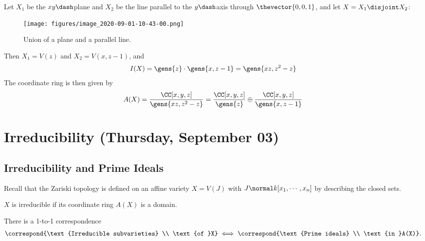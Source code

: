 \begin{example}

Let \(X_1\) be the \(xy\dash\)plane and \(X_2\) be the line parallel to
the \(y\dash\)axis through \(\thevector{0,0,1}\), and let
\(X= X_1 \disjoint X_2\):

\begin{figure}
\centering
\texttt{[image: figures/image\_2020-09-01-10-43-00.png]}
\caption{Union of a plane and a parallel line.}
\end{figure}

Then \(X_1 = V(z)\) and \(X_2 = V(x, z-1)\), and
\begin{align*}
I(X) = \gens{z} \cdot \gens{x, z-1}=  \gens{xz, z^2 - z}
\end{align*} The coordinate ring is then given by
\begin{align*}
A(X) = { \CC[x, y, z] \over \gens{xz, z^2 - z} } = { \CC[x, y, z] \over  \gens{z} } \oplus { \CC[x, y,z] \over \gens{x, z-1} }
\end{align*}

\end{example}

\hypertarget{irreducibility-thursday-september-03}{%
\section{Irreducibility (Thursday, September
03)}\label{irreducibility-thursday-september-03}}

\hypertarget{irreducibility-and-prime-ideals}{%
\subsection{Irreducibility and Prime
Ideals}\label{irreducibility-and-prime-ideals}}

Recall that the Zariski topology is defined on an affine variety
\(X = V(J)\) with \(J \normal k[x_1, \cdots, x_n]\) by describing the
closed sets.

\begin{proposition}[?]

\(X\) is irreducible if its coordinate ring \(A(X)\) is a domain.

\end{proposition}

\begin{proposition}[?]

There is a 1-to-1 correspondence
\begin{align*}  
\correspond{\text{Irreducible subvarieties} \\ \text{of }X}
\iff
\correspond{\text{Prime ideals} \\ \text{in }A(X)}
.\end{align*}

\end{proposition}

